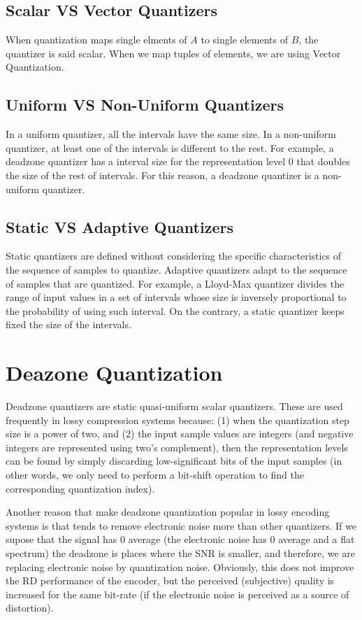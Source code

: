 \subsection{Scalar VS Vector Quantizers}

When quantization maps single elments of $A$ to single elements of
$B$, the quantizer is said scalar. When we map tuples of elements, we
are using Vector Quantization.

\subsection{Uniform VS Non-Uniform Quantizers}

In a uniform quantizer, all the intervals have the same size. In a
non-uniform quantizer, at least one of the intervals is different to
the rest. For example, a deadzone quantizer has a interval size for
the representation level 0 that doubles the size of the rest of
intervals. For this reason, a deadzone quantizer is a non-uniform
quantizer.

\subsection{Static VS Adaptive Quantizers}

Static quantizers are defined without considering the specific
characteristics of the sequence of samples to quantize. Adaptive
quantizers adapt to the sequence of samples that are quantized. For
example, a Lloyd-Max quantizer divides the range of input values in a
set of intervals whose size is inversely proportional to the
probability of using such interval. On the contrary, a static
quantizer keeps fixed the size of the intervals.

\section{Deazone Quantization}

Deadzone quantizers are static quasi-uniform scalar quantizers. These
are used frequently in lossy compression systems because: (1) when the
quantization step size is a power of two, and (2) the input sample
values are integers (and negative integers are represented using two's
complement), then the representation levels can be found by simply
discarding low-significant bits of the input samples (in other words,
we only need to perform a bit-shift operation to find the corresponding quantization index).

Another reason that make deadzone quantization popular in lossy
encoding systems is that tends to remove electronic noise more than
other quantizers. If we supose that the signal has 0 average (the
electronic noise has 0 average and a flat spectrum) the deadzone is
places where the SNR is smaller, and therefore, we are replacing
electronic noise by quantization noise. Obviously, this does not
improve the RD performance of the encoder, but the perceived
(subjective) quality is increased for the same bit-rate (if the
electronic noise is perceived as a source of distortion).

